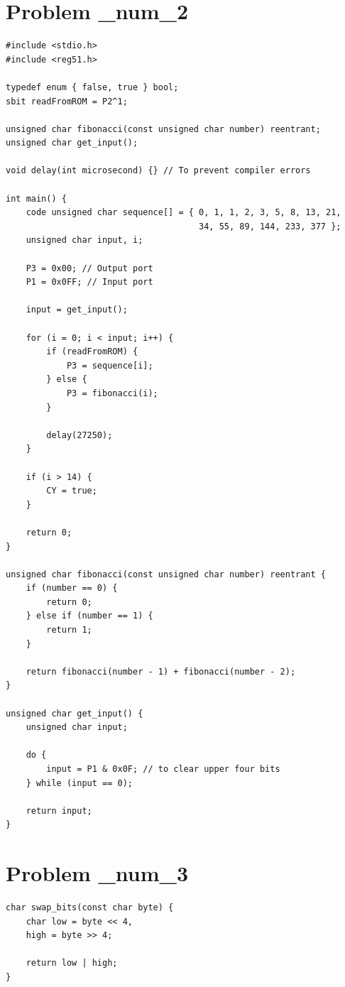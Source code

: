 \documentclass[12pt]{article}
\begin{document}
\section{Problem \_num_2}
\begin{verbatim}
#include <stdio.h>
#include <reg51.h>

typedef enum { false, true } bool;
sbit readFromROM = P2^1;

unsigned char fibonacci(const unsigned char number) reentrant;
unsigned char get_input();

void delay(int microsecond) {} // To prevent compiler errors

int main() {
    code unsigned char sequence[] = { 0, 1, 1, 2, 3, 5, 8, 13, 21,
                                      34, 55, 89, 144, 233, 377 };
    unsigned char input, i;

    P3 = 0x00; // Output port
    P1 = 0x0FF; // Input port

    input = get_input();

    for (i = 0; i < input; i++) {
        if (readFromROM) {
            P3 = sequence[i];
        } else {
            P3 = fibonacci(i);
        }

        delay(27250);
    }

    if (i > 14) {
        CY = true;
    }

    return 0;
}

unsigned char fibonacci(const unsigned char number) reentrant {
    if (number == 0) {
        return 0;
    } else if (number == 1) {
        return 1;
    }

    return fibonacci(number - 1) + fibonacci(number - 2);
}

unsigned char get_input() {
    unsigned char input;

    do {
        input = P1 & 0x0F; // to clear upper four bits
    } while (input == 0);

    return input;
}
\end{verbatim}

\section{Problem \_num_3}
\begin{verbatim}
char swap_bits(const char byte) {
    char low = byte << 4,
    high = byte >> 4;

    return low | high;
}
\end{verbatim}
\end{document}
